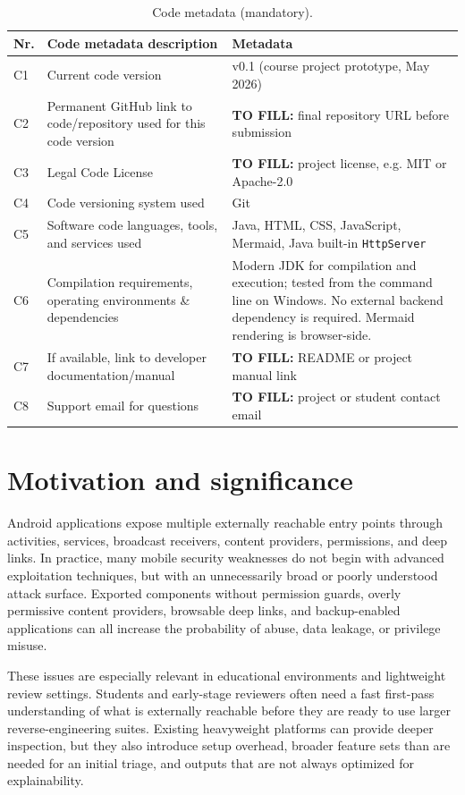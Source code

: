 \documentclass[preprint,12pt,a4paper]{elsarticle}
\begin{document}
\begin{table}[H]
\centering
\begin{tabular}{|l|p{5.2cm}|p{7.4cm}|}
\hline
\textbf{Nr.} & \textbf{Code metadata description} & \textbf{Metadata} \\
\hline
C1 & Current code version & v0.1 (course project prototype, May 2026) \\
\hline
C2 & Permanent GitHub link to code/repository used for this code version & \textbf{TO FILL:} final repository URL before submission \\
\hline
C3 & Legal Code License & \textbf{TO FILL:} project license, e.g. MIT or Apache-2.0 \\
\hline
C4 & Code versioning system used & Git \\
\hline
C5 & Software code languages, tools, and services used & Java, HTML, CSS, JavaScript, Mermaid, Java built-in \texttt{HttpServer} \\
\hline
C6 & Compilation requirements, operating environments \& dependencies & Modern JDK for compilation and execution; tested from the command line on Windows. No external backend dependency is required. Mermaid rendering is browser-side. \\
\hline
C7 & If available, link to developer documentation/manual & \textbf{TO FILL:} README or project manual link \\
\hline
C8 & Support email for questions & \textbf{TO FILL:} project or student contact email \\
\hline
\end{tabular}
\caption{Code metadata (mandatory).}
\label{tab:metadata}
\end{table}

\section{Motivation and significance}

Android applications expose multiple externally reachable entry points through activities, services, broadcast receivers, content providers, permissions, and deep links. In practice, many mobile security weaknesses do not begin with advanced exploitation techniques, but with an unnecessarily broad or poorly understood attack surface. Exported components without permission guards, overly permissive content providers, browsable deep links, and backup-enabled applications can all increase the probability of abuse, data leakage, or privilege misuse.

These issues are especially relevant in educational environments and lightweight review settings. Students and early-stage reviewers often need a fast first-pass understanding of what is externally reachable before they are ready to use larger reverse-engineering suites. Existing heavyweight platforms can provide deeper inspection, but they also introduce setup overhead, broader feature sets than are needed for an initial triage, and outputs that are not always optimized for explainability.
\end{document}
